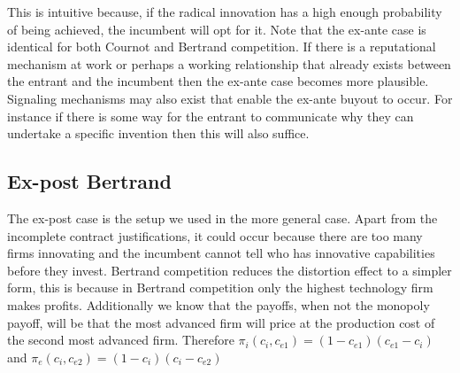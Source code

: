 This is intuitive because, if the radical innovation has a high enough probability of being achieved, the incumbent will opt for it. Note that the ex-ante case is identical for both Cournot and Bertrand competition. If there is a reputational mechanism at work or perhaps a working relationship that already exists between the entrant and the incumbent then the ex-ante case becomes more plausible. Signaling mechanisms may also exist that enable the ex-ante buyout to occur. For instance if there is some way for the entrant to communicate why they can undertake a specific invention then this will also suffice.

\subsection{Ex-post Bertrand}
The ex-post case is the setup we used in the more general case. Apart from the incomplete contract justifications, it could occur because there are too many firms innovating and the incumbent cannot tell who has innovative capabilities before they invest. Bertrand competition reduces the distortion effect to a simpler form, this is because in Bertrand competition only the highest technology firm makes profits. Additionally we know that the payoffs, when not the monopoly payoff, will be that the most advanced firm will price at the production cost of the second most advanced firm. Therefore $\pi_i(c_i,c_{e1})= (1-c_{e1})(c_{e1}-c_i)$ and $\pi_e(c_i,c_{e2})= (1-c_{i})(c_{i}-c_{e2})$

 


